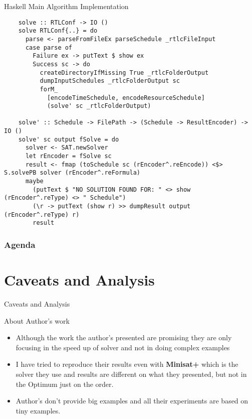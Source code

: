 \documentclass{beamer}
\begin{document}
\begin{frame}[fragile]{Haskell Main Algorithm Implementation}

  \begin{verbatim}
    solve :: RTLConf -> IO ()
    solve RTLConf{..} = do
      parse <- parseFromFileEx parseSchedule _rtlcFileInput
      case parse of
        Failure ex -> putText $ show ex
        Success sc -> do
          createDirectoryIfMissing True _rtlcFolderOutput
          dumpInputSchedules _rtlcFolderOutput sc
          forM_ 
            [encodeTimeSchedule, encodeResourceSchedule]
            (solve' sc _rtlcFolderOutput)
    
    solve' :: Schedule -> FilePath -> (Schedule -> ResultEncoder) -> IO ()
    solve' sc output fSolve = do
      solver <- SAT.newSolver
      let rEncoder = fSolve sc
      result <- fmap (toSchedule sc (rEncoder^.reEncode)) <$> S.solvePB solver (rEncoder^.reFormula)
      maybe 
        (putText $ "NO SOLUTION FOUND FOR: " <> show (rEncoder^.reType) <> " Schedule") 
        (\r -> putText (show r) >> dumpResult output (rEncoder^.reType) r)
        result
  \end{verbatim}

\end{frame}

\begin{frame}
  \frametitle{Agenda}
  \section{Caveats and Analysis}
  \tableofcontents[currentsection]
\end{frame}

\begin{frame}[fragile]{Caveats and Analysis}
  \begin{block}{About Author's work}
    \begin{itemize}
      \item Although the work the author's presented are promising they are only focusing in the speed up of solver and not in doing complex examples
      \item I have tried to reproduce their results even with \textbf{Minisat+} which is the solver they use and results are different on what they presented, but not in the Optimum just on the order.
      \item Author's don't provide big examples and all their experiments are based on tiny examples.
  \end{itemize}
  \end{block}
\end{frame}
\end{document}
